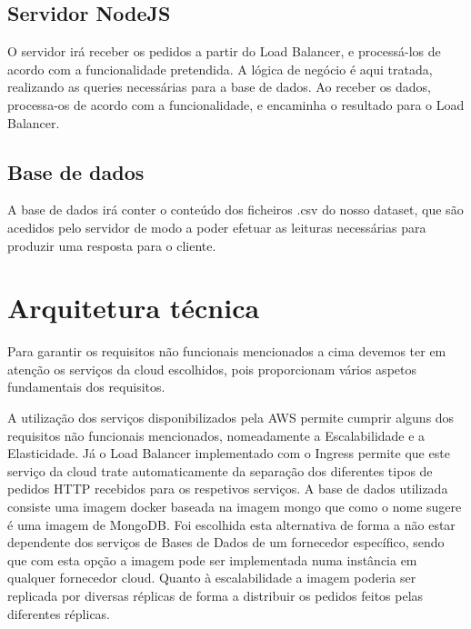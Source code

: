 \documentclass[11pt,a4paper]{article}
\begin{document}
\subsection{Servidor NodeJS}
O servidor irá receber os pedidos a partir do Load Balancer, e processá-los de acordo com a funcionalidade pretendida. A lógica de negócio é aqui tratada, realizando as queries necessárias para a base de dados. Ao receber os dados, processa-os de acordo com a funcionalidade, e encaminha o resultado para o Load Balancer.

\subsection{Base de dados}
A base de dados irá conter o conteúdo dos ficheiros .csv do nosso dataset, que são acedidos pelo servidor de modo a poder efetuar as leituras necessárias para produzir uma resposta para o cliente. 

\section{Arquitetura técnica}

Para garantir os requisitos não funcionais mencionados a cima devemos ter em atenção os serviços da cloud escolhidos, pois proporcionam vários aspetos fundamentais dos requisitos.
\newline

A utilização dos serviços disponibilizados pela AWS permite cumprir alguns dos requisitos não funcionais mencionados, nomeadamente a Escalabilidade e a Elasticidade. Já o Load Balancer implementado com o Ingress permite que este serviço da cloud trate automaticamente da separação dos diferentes tipos de pedidos HTTP recebidos para os respetivos serviços. A base de dados utilizada consiste uma imagem docker baseada na imagem mongo que como o nome sugere é uma imagem de MongoDB. Foi escolhida esta alternativa de forma a não estar dependente dos serviços de Bases de Dados de um fornecedor específico, sendo que com esta opção a imagem pode ser implementada numa instância em qualquer fornecedor cloud. Quanto à escalabilidade a imagem poderia ser replicada por diversas réplicas de forma a distribuir os pedidos feitos pelas diferentes réplicas.  %
\newline
\end{document}
